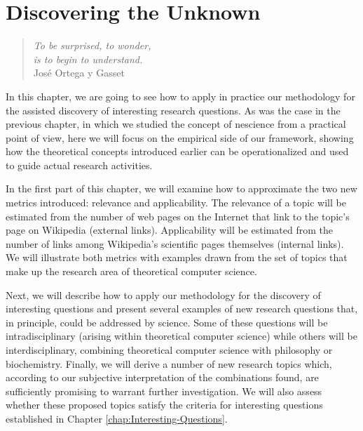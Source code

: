 %
%


\chapter{Discovering the Unknown}
\label{chap:Discovering_Unknown}

\begin{quote}
\begin{flushright}
\emph{To be surprised, to wonder, \\
is to begin to understand.}\\
José Ortega y Gasset \\
\end{flushright}
\end{quote}
\bigskip

In this chapter, we are going to see how to apply in practice our methodology for the assisted discovery of interesting research questions. As was the case in the previous chapter, in which we studied the concept of nescience from a practical point of view, here we will focus on the empirical side of our framework, showing how the theoretical concepts introduced earlier can be operationalized and used to guide actual research activities.

In the first part of this chapter, we will examine how to approximate the two new metrics introduced: relevance and applicability. The relevance of a topic will be estimated from the number of web pages on the Internet that link to the topic's page on Wikipedia (external links). Applicability will be estimated from the number of links among Wikipedia's scientific pages themselves (internal links). We will illustrate both metrics with examples drawn from the set of topics that make up the research area of theoretical computer science.

Next, we will describe how to apply our methodology for the discovery of interesting questions and present several examples of new research questions that, in principle, could be addressed by science. Some of these questions will be intradisciplinary (arising within theoretical computer science) while others will be interdisciplinary, combining theoretical computer science with philosophy or biochemistry. Finally, we will derive a number of new research topics which, according to our subjective interpretation of the combinations found, are sufficiently promising to warrant further investigation. We will also assess whether these proposed topics satisfy the criteria for interesting questions established in Chapter \ref{chap:Interesting-Questions}.

